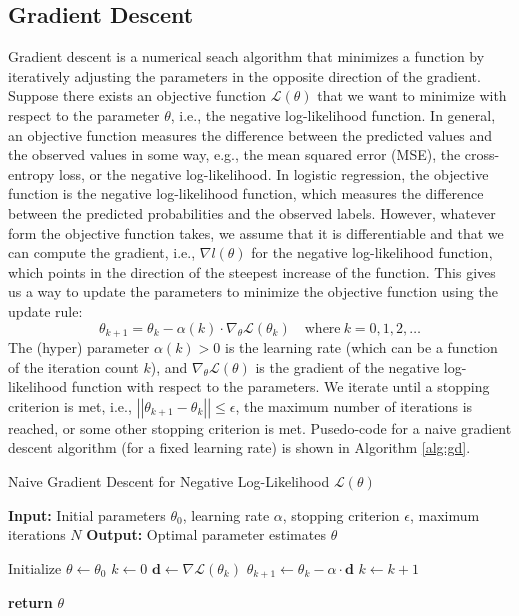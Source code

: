 \documentclass{article}[11pt]
\newcommand{\norm}[1]{\left|\left|#1\right|\right|}
\begin{document}
\subsection{Gradient Descent}
Gradient descent is a numerical seach algorithm that minimizes a function by iteratively adjusting the parameters in the opposite direction of the gradient.
Suppose there exists an objective function $\mathcal{L}(\theta)$ that we want to minimize with respect to the parameter $\theta$, i.e., the negative log-likelihood function.
In general, an objective function measures the difference between the predicted values and the observed values in some way, e.g., the mean squared error (MSE), the cross-entropy loss, or the negative log-likelihood.
In logistic regression, the objective function is the negative log-likelihood function, which measures the difference between the predicted probabilities and the observed labels. However, whatever form the objective function takes, we assume that it is differentiable and that we can compute the gradient, i.e., $\nabla{l}(\theta)$ for the negative log-likelihood function, 
which points in the direction of the steepest increase of the function. This gives us a way to update the parameters to minimize the objective function using the update rule:
\begin{equation*}
\theta_{k+1} = \theta_{k} - \alpha(k)\cdot\nabla_{\theta}\mathcal{L}(\theta_{k})\quad\text{where}{~k = 0,1,2,\dots}
\end{equation*}
The (hyper) parameter $\alpha(k)>0$ is the learning rate (which can be a function of the iteration count $k$), and $\nabla_{\theta}\mathcal{L}(\theta)$ is the gradient of the negative log-likelihood function with respect to the parameters.  
We iterate until a stopping criterion is met, i.e., $\norm{\theta_{k+1} - \theta_{k}}\leq\epsilon$, the maximum number of iterations is reached, or some other stopping criterion is met.
Pusedo-code for a naive gradient descent algorithm (for a fixed learning rate) is shown in Algorithm \ref{alg:gd}.
\begin{algorithm}[H]
\caption{Naive Gradient Descent for Negative Log-Likelihood $\mathcal{L}(\theta)$}\label{alg:gd}
\begin{algorithmic}[1]
\State \textbf{Input:} Initial parameters $\theta_0$, learning rate $\alpha$, stopping criterion $\epsilon$, maximum iterations $N$
\State \textbf{Output:} Optimal parameter estimates $\theta$

\State Initialize $\theta \gets \theta_0$
\State $k \gets 0$
    \State $\mathbf{d} \gets \nabla \mathcal{L}(\theta_{k})$
    \State $\theta_{k+1} \gets \theta_{k} - \alpha \cdot \mathbf{d}$
    \State $k \gets k + 1$
\EndWhile

\State \textbf{return} $\theta$
\end{algorithmic}
\end{algorithm}
\end{document}
